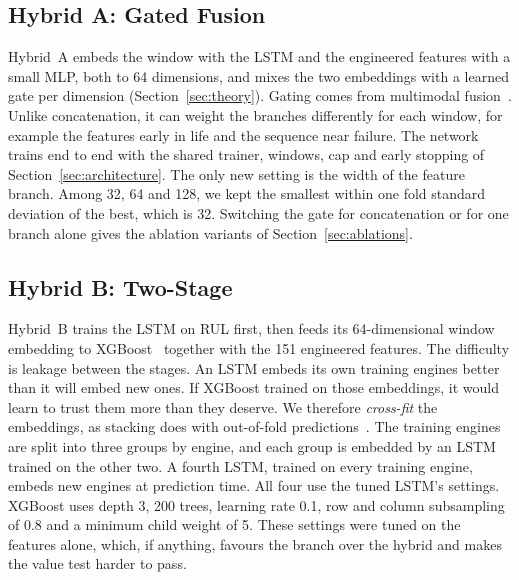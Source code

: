 \subsection{Hybrid A: Gated Fusion}
Hybrid~A embeds the window with the LSTM and the engineered features with a
small MLP, both to 64 dimensions, and mixes the two embeddings with a learned
gate per dimension (Section~\ref{sec:theory}). Gating comes from multimodal
fusion~\cite{Arevalo2017gated}. Unlike concatenation, it can weight the
branches differently for each window, for example the features early in life
and the sequence near failure. The network trains end to end with the shared
trainer, windows, cap and early stopping of Section~\ref{sec:architecture}.
The only new setting is the width of the feature branch. Among 32, 64 and 128,
we kept the smallest within one fold standard deviation of the best, which
is 32. Switching the gate for concatenation or for one branch alone gives the
ablation variants of Section~\ref{sec:ablations}.

\subsection{Hybrid B: Two-Stage}
Hybrid~B trains the LSTM on RUL first, then feeds its 64-dimensional window
embedding to XGBoost~\cite{Chen2016xgboost} together with the 151 engineered
features. The difficulty is leakage between the stages. An LSTM embeds its own
training engines better than it will embed new ones. If XGBoost trained on
those embeddings, it would learn to trust them more than they deserve. We
therefore \emph{cross-fit} the embeddings, as stacking does with out-of-fold
predictions~\cite{Wolpert1992stacked}. The training engines are split into
three groups by engine, and each group is embedded by an LSTM trained on the
other two. A fourth LSTM, trained on every training engine, embeds new
engines at prediction time. All four use the tuned LSTM's settings. XGBoost
uses depth 3, 200 trees, learning rate 0.1, row and column subsampling of 0.8
and a minimum child weight of 5. These settings were tuned on the features
alone, which, if anything, favours the branch over the hybrid and makes the
value test harder to pass.

